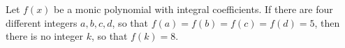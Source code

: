 Let $f(x)$ be a monic polynomial with integral coefficients. If there are four different integers $a, b, c, d$, so that $f(a) = f(b) = f(c) = f(d) = 5$, then there is no integer $k$, so that $f(k) = 8$.
